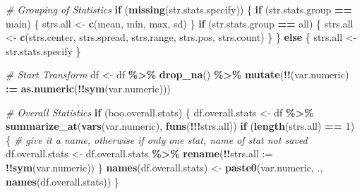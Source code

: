 \documentclass[
]{book}
\newenvironment{Shaded}{\begin{snugshade}}{\end{snugshade}}
\newcommand{\CommentTok}[1]{\textcolor[rgb]{0.56,0.35,0.01}{\textit{#1}}}
\newcommand{\ControlFlowTok}[1]{\textcolor[rgb]{0.13,0.29,0.53}{\textbf{#1}}}
\newcommand{\DataTypeTok}[1]{\textcolor[rgb]{0.13,0.29,0.53}{#1}}
\newcommand{\DecValTok}[1]{\textcolor[rgb]{0.00,0.00,0.81}{#1}}
\newcommand{\ErrorTok}[1]{\textcolor[rgb]{0.64,0.00,0.00}{\textbf{#1}}}
\newcommand{\KeywordTok}[1]{\textcolor[rgb]{0.13,0.29,0.53}{\textbf{#1}}}
\newcommand{\NormalTok}[1]{#1}
\newcommand{\OperatorTok}[1]{\textcolor[rgb]{0.81,0.36,0.00}{\textbf{#1}}}
\newcommand{\StringTok}[1]{\textcolor[rgb]{0.31,0.60,0.02}{#1}}
\begin{document}
\begin{Shaded}
\begin{Highlighting}[]
  \CommentTok{\# Grouping of Statistics}
  \ControlFlowTok{if}\NormalTok{ (}\KeywordTok{missing}\NormalTok{(str.stats.specify)) \{}
    \ControlFlowTok{if}\NormalTok{ (str.stats.group }\OperatorTok{==}\StringTok{ \textquotesingle{}main\textquotesingle{}}\NormalTok{) \{}
\NormalTok{      strs.all \textless{}{-}}\StringTok{ }\KeywordTok{c}\NormalTok{(}\StringTok{\textquotesingle{}mean\textquotesingle{}}\NormalTok{, }\StringTok{\textquotesingle{}min\textquotesingle{}}\NormalTok{, }\StringTok{\textquotesingle{}max\textquotesingle{}}\NormalTok{, }\StringTok{\textquotesingle{}sd\textquotesingle{}}\NormalTok{)}
\NormalTok{    \}}
    \ControlFlowTok{if}\NormalTok{ (str.stats.group }\OperatorTok{==}\StringTok{ \textquotesingle{}all\textquotesingle{}}\NormalTok{) \{}
\NormalTok{      strs.all \textless{}{-}}\StringTok{ }\KeywordTok{c}\NormalTok{(strs.center, strs.spread, strs.range, strs.pos, strs.count)}
\NormalTok{    \}}
\NormalTok{  \} }\ControlFlowTok{else}\NormalTok{ \{}
\NormalTok{    strs.all \textless{}{-}}\StringTok{ }\NormalTok{str.stats.specify}
\NormalTok{  \}}
  
  \CommentTok{\# Start Transform}
\NormalTok{  df \textless{}{-}}\StringTok{ }\NormalTok{df }\OperatorTok{\%\textgreater{}\%}\StringTok{ }\KeywordTok{drop\_na}\NormalTok{() }\OperatorTok{\%\textgreater{}\%}\StringTok{ }
\StringTok{    }\KeywordTok{mutate}\NormalTok{(}\OperatorTok{!!}\NormalTok{(var.numeric) }\OperatorTok{:}\ErrorTok{=}\StringTok{ }\KeywordTok{as.numeric}\NormalTok{(}\OperatorTok{!!}\KeywordTok{sym}\NormalTok{(var.numeric)))}
  
  \CommentTok{\# Overall Statistics}
  \ControlFlowTok{if}\NormalTok{ (boo.overall.stats) \{}
\NormalTok{    df.overall.stats \textless{}{-}}\StringTok{ }\NormalTok{df }\OperatorTok{\%\textgreater{}\%}\StringTok{ }
\StringTok{      }\KeywordTok{summarize\_at}\NormalTok{(}\KeywordTok{vars}\NormalTok{(var.numeric), }\KeywordTok{funs}\NormalTok{(}\OperatorTok{!!!}\NormalTok{strs.all))}
    \ControlFlowTok{if}\NormalTok{ (}\KeywordTok{length}\NormalTok{(strs.all) }\OperatorTok{==}\StringTok{ }\DecValTok{1}\NormalTok{) \{}
      \CommentTok{\# give it a name, otherwise if only one stat, name of stat not saved}
\NormalTok{      df.overall.stats \textless{}{-}}\StringTok{ }\NormalTok{df.overall.stats }\OperatorTok{\%\textgreater{}\%}\StringTok{ }
\StringTok{        }\KeywordTok{rename}\NormalTok{(}\OperatorTok{!!}\DataTypeTok{strs.all :=} \OperatorTok{!!}\KeywordTok{sym}\NormalTok{(var.numeric))}
\NormalTok{    \}}
    \KeywordTok{names}\NormalTok{(df.overall.stats) \textless{}{-}}\StringTok{ }
\StringTok{      }\KeywordTok{paste0}\NormalTok{(var.numeric, }\StringTok{\textquotesingle{}.\textquotesingle{}}\NormalTok{, }\KeywordTok{names}\NormalTok{(df.overall.stats))}
\NormalTok{  \}}
  

\end{Highlighting}
\end{Shaded}
\end{document}
